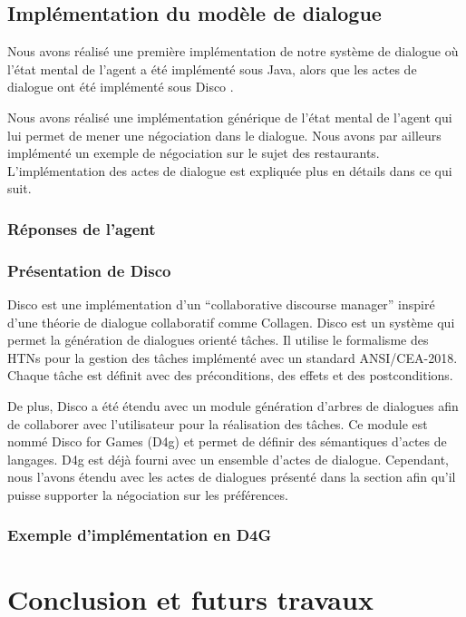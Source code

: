 \documentclass [french]{sig-alternate-05-2015}
\begin{document}
\subsection{Implémentation du modèle de dialogue}
{\color{red}
\par Nous avons réalisé une première implémentation de notre système de dialogue où l'état mental de l'agent a été implémenté sous Java, alors que les actes de dialogue ont été implémenté sous Disco \cite{rich2009building}.
\par Nous avons réalisé une implémentation générique de l'état mental de l'agent qui lui permet de mener une négociation dans le dialogue. Nous avons par ailleurs implémenté un exemple de négociation sur le sujet des restaurants.  L'implémentation des actes de dialogue est expliquée plus en détails dans ce qui suit.}

\subsubsection{Réponses de l'agent}
\subsubsection{Présentation de Disco}
Disco est une implémentation d'un ``collaborative discourse manager'' inspiré d'une théorie de dialogue collaboratif comme Collagen.  Disco est un système qui permet la génération de dialogues orienté tâches. Il utilise le formalisme des HTNs pour la gestion des tâches implémenté avec un standard ANSI/CEA-2018.
Chaque tâche est définit avec des préconditions, des effets et des postconditions. 
\par De plus, Disco a été étendu avec un module génération d'arbres de dialogues afin de collaborer avec l'utilisateur pour la réalisation des tâches. Ce module est nommé Disco for Games (D4g) et permet de définir des sémantiques d'actes de langages. D4g est déjà fourni avec un ensemble d'actes de dialogue. Cependant, nous l'avons étendu avec les actes de dialogues présenté dans la section afin \label{contribution}qu'il puisse supporter la négociation sur les préférences. 
\subsubsection{Exemple d'implémentation en D4G} 
\section{Conclusion et futurs travaux}
\label{conc}

\vskip 4pt


\end{document}
